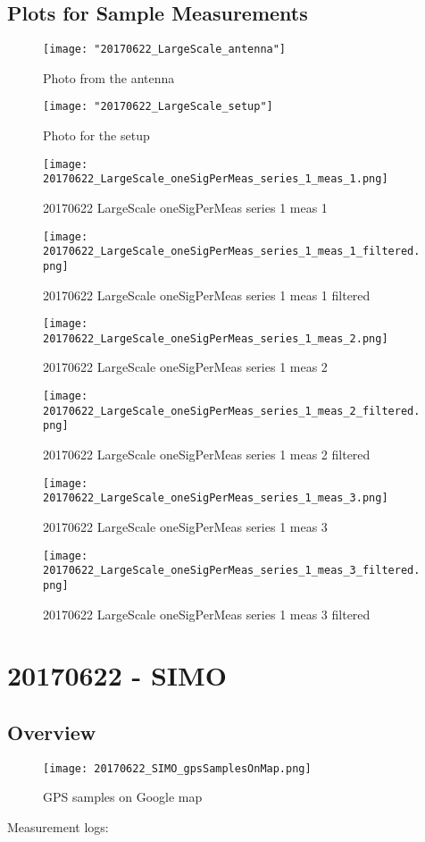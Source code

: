 \subsection{Plots for Sample Measurements}
\begin{figure}[ht] \caption{Photo from the antenna}
\texttt{[image: "20170622\_LargeScale\_antenna"]}\centering\end{figure}
\begin{figure}[ht] \caption{Photo for the setup}
\texttt{[image: "20170622\_LargeScale\_setup"]}\centering\end{figure}
\begin{figure}[ht] \caption{20170622 LargeScale oneSigPerMeas series 1 meas 1}
\texttt{[image: 20170622\_LargeScale\_oneSigPerMeas\_series\_1\_meas\_1.png]}\centering\end{figure}
\begin{figure}[ht] \caption{20170622 LargeScale oneSigPerMeas series 1 meas 1 filtered}
\texttt{[image: 20170622\_LargeScale\_oneSigPerMeas\_series\_1\_meas\_1\_filtered.png]}\centering\end{figure}
\begin{figure}[ht] \caption{20170622 LargeScale oneSigPerMeas series 1 meas 2}
\texttt{[image: 20170622\_LargeScale\_oneSigPerMeas\_series\_1\_meas\_2.png]}\centering\end{figure}
\begin{figure}[ht] \caption{20170622 LargeScale oneSigPerMeas series 1 meas 2 filtered}
\texttt{[image: 20170622\_LargeScale\_oneSigPerMeas\_series\_1\_meas\_2\_filtered.png]}\centering\end{figure}
\begin{figure}[ht] \caption{20170622 LargeScale oneSigPerMeas series 1 meas 3}
\texttt{[image: 20170622\_LargeScale\_oneSigPerMeas\_series\_1\_meas\_3.png]}\centering\end{figure}
\begin{figure}[ht] \caption{20170622 LargeScale oneSigPerMeas series 1 meas 3 filtered}
\texttt{[image: 20170622\_LargeScale\_oneSigPerMeas\_series\_1\_meas\_3\_filtered.png]}\centering\end{figure}
\clearpage
\section{20170622 - SIMO}
\subsection{Overview}
\begin{figure}[ht] \caption{GPS samples on Google map}
\texttt{[image: 20170622\_SIMO\_gpsSamplesOnMap.png]}\centering\end{figure}
\begin{minipage}{\textwidth} Measurement logs:

 \end{minipage}
\clearpage
